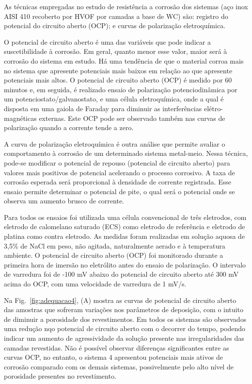 As técnicas empregadas no estudo de resistência a corrosão dos sistemas (aço
inox AISI 410 recoberto por HVOF por camadas a base de WC) são: registro do
potencial do circuito aberto (OCP); e curvas de polarização eletroquímica. 

O potencial de circuito aberto é uma das variáveis que pode indicar a
suscetibilidade à corrosão. Em geral, quanto menor esse valor, maior será à
corrosão do sistema em estudo. Há uma tendência de que o material corroa mais no
sistema que apresente potenciais mais baixos em relação ao que apresente
potenciais mais altos. O potencial de circuito aberto (OCP) é medido por 60
minutos e, em seguida, é realizado ensaio de polarização potenciodinâmica
por um potenciostato/galvanostato, e uma célula eletroquímica,
onde a qual é disposta em uma gaiola de Faraday para diminuir as interferências
elétro-magnéticas externas. Este OCP pode ser observado também nas curvas
de polarização quando a corrente tende a zero.

A curva de polarização eletroquímica é outra análise que permite avaliar o
comportamento à corrosão de um determinado sistema metal-meio. Nessa técnica,
pode-se modificar o potencial de repouso (potencial de circuito aberto) para
valores mais positivos de potencial acelerando o processo corrosivo. A taxa de
corrosão esperada será proporcional à densidade de corrente registrada. Esse
ensaio permite determinar o potencial de pite, o qual será o potencial onde se
observa um aumento brusco de corrente.

Para todos os ensaios foi utilizada uma célula convencional de três eletrodos,
com eletrodo de calomelano saturado (ECS) como eletrodo de referência e eletrodo
de platina como contra eletrodo. As medidas foram realizadas em solução aquosa
de 3,5\% de NaCl em peso, não agitada, naturalmente aerado e à temperatura
ambiente. O potencial de circuito aberto (OCP) foi monitorado durante a primeira
hora de imersão no eletrólito antes do ensaio de polarização. O intervalo de
varredura foi de -100 mV abaixo do potencial de circuito aberto até 300 mV acima
do OCP, com uma velocidade de varredura de 1 mV/s.

Na Fig.~\ref{fig:adequacao4}, (A) mostra as curvas de potencial de circuito
aberto das amostras que sofreram variações nos parâmetros de deposição, com o
intuito de diminuir a porosidade dos revestimentos. Em todos os sistemas são
observados uma redução nqo potencial de circuito aberto com o decorrer do tempo,
podendo indicar um aumento de agressividade da solução presente nas irregularidades das camadas revestidas.
Não é possível observar diferenças significantes entre as curvas OCP, no
entanto, o sistema 4 apresentou potenciais mais ativos de corrosão comparado com
os demais sistemas, possivelmente pelo alto nível de porosidade presentes no
revestimento.

